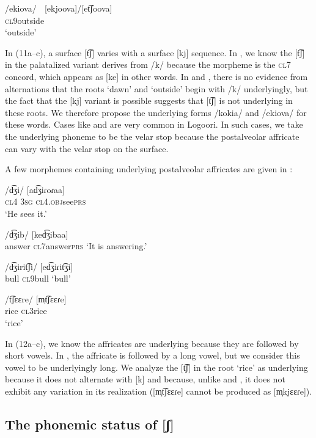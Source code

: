 \documentclass[output=paper]{langsci/langscibook}
\begin{document}
\ea{}
 /ekiova/    [ekjoova]/[et͡ʃoova]\\{}
\textsc{cl9}outside\\{}
\glt ‘outside’
\z

In (11a–c), a surface [t͡ʃ] varies with a surface [kj] sequence. In , we know the [t͡ʃ] in the palatalized variant derives from /k/ because the morpheme is the \textsc{cl}7 concord, which appears as [ke] in other words. In  and , there is no evidence from alternations that the roots ‘dawn’ and ‘outside’ begin with /k/ underlyingly, but the fact that the [kj] variant is possible suggests that [t͡ʃ] is not underlying in these roots. We therefore propose the underlying forms /kokia/ and /ekiova/ for these words. Cases like  and  are very common in Logoori. In such cases, we take the underlying phoneme to be the velar stop because the postalveolar affricate can vary with the velar stop on the surface. 

A few morphemes containing underlying postalveolar affricates are given in :

\ea{}
 /d͡ʒi/  [ad͡ʒiɾoɾaa]\\{}
\textsc{cl4  3sg cl4.obj}see\textsc{prs}\\{}
\glt ‘He sees it.’
\z

\ea{}
 /d͡ʒib/  [ked͡ʒibaa]\\{}
answer  \textsc{cl7}answer\textsc{prs}
\glt ‘It is answering.’
\z

\ea{}
 /d͡ʒirit͡ʃi/  [ed͡ʒiɾit͡ʒi]\\{}
bull  \textsc{cl9}bull
    ‘bull’
\z

\ea{}
 /t͡ʃɛɛre/  [m̩t͡ʃɛɛɾe]\\{}
rice  \textsc{cl3}rice\\{}
\glt    ‘rice’
\z


In (12a–c), we know the affricates are underlying because they are followed by short vowels. In , the affricate is followed by a long vowel, but we consider this vowel to be underlyingly long. We analyze the [t͡ʃ] in the root ‘rice’ as underlying because it does not alternate with [k] and because, unlike  and , it does not exhibit any variation in its realization ([m̩t͡ʃɛɛɾe] cannot be produced as [m̩kjɛɛɾe]).

\subsection{The phonemic status of [ʃ]} %
\end{document}
